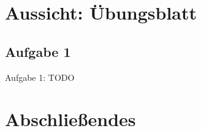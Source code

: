 \section[Aussicht: Übungsblatt \T{Integer.MAX\_VALUE}]{Aussicht: Übungsblatt \textbf{}}
\subsection{Aufgabe 1}
\begin{frame}{Aufgabe 1: TODO}

\end{frame}
\fi

\section{Abschließendes}

